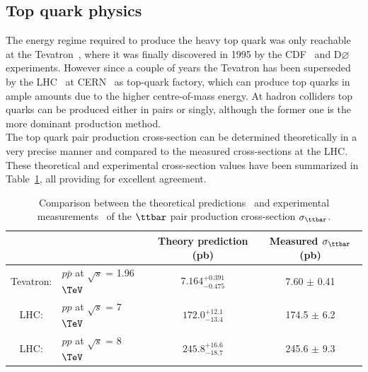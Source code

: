 \subsection{Top quark physics} 
The energy regime required to produce the heavy top quark was only reachable at the Tevatron~\cite{Tevatron}, where it was finally discovered in 1995 by the CDF~\cite{CDF} and D$\varnothing$~\cite{D0} experiments. However since a couple of years the Tevatron has been superseded by the LHC~\cite{} at CERN~\cite{CERN} as top-quark factory, which can produce top quarks in ample amounts due to the higher centre-of-mass energy. %
At hadron colliders top quarks can be produced either in pairs or singly, although the former one is the more dominant production method.
\\
The top quark pair production cross-section can be determined theoretically in a very precise manner and compared to the measured cross-sections at the LHC. These theoretical and experimental cross-section values have been summarized in Table~\ref{table::XSTopPair}, all providing for excellent agreement. %
\begin{table}[h!t]
 \centering
 \caption{Comparison between the theoretical predictions~\cite{CzakonTopPairXS, CzakonGluonPDF} and experimental measurements~\cite{TevatronTTbarXS, CMSTTbarXS} of the $\ttbar$ pair production cross-section $\sigma_{\ttbar}$.} \label{table::XSTopPair}
 \begin{tabular}{|cl|c|c|}
  \hline
		&						& Theory prediction (pb) 	& Measured $\sigma_{\ttbar}$ (pb) 	\\
  \hline						
  Tevatron: 	& $p\bar{p}$ at $\sqrt{s}$ = 1.96 $\TeV$ 	& $7.164^{+0.391}_{-0.475}$	& 7.60 $\pm$ 0.41			\\
  LHC: 		& $pp$ at $\sqrt{s}$ = 7 $\TeV$ 		& $172.0^{+12.1}_{-13.4}$	& 174.5 $\pm$ 6.2			\\
  LHC: 		& $pp$ at $\sqrt{s}$ = 8 $\TeV$ 		& $245.8^{+16.6}_{-18.7}$	& 245.6 $\pm$ 9.3			\\
  \hline
 \end{tabular}
\end{table}

